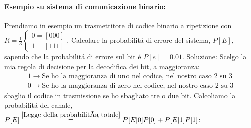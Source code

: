             \paragraph{Esempio su sistema di comunicazione binario:}
                Prendiamo in esempio un trasmettitore di codice binario a ripetizione con $R = \frac{1}{3}
                \begin{cases}
                    0 = [000]\nonumber \\
                    1 = [111]\nonumber    
                \end{cases}$. Calcolare la probabilitá di errore del sistema, $P[E]$, sapendo che la probabilitá di errore sul
                bit é $P[e] = 0.01$.
                Soluzione:
                Scelgo la mia regola di decisione per la decodifica dei bit, a maggioranza:
                \begin{gather}
                    1 \rightarrow \text{Se ho la maggioranza di uno nel codice, nel nostro caso 2 su 3} \nonumber \\
                    0 \rightarrow \text{Se ho la maggioranza di zero nel codice, nel nostro caso 2 su 3} \nonumber
                \end{gather}
                sbaglio il codice in trasmissione se ho sbagliato tre o due bit. Calcoliamo la probabilitá del canale,
                $P[E] \overset{\ref{Legge della probabilitá totale}}{=} P[E|0]P[0] + P[E|1]P[1]$:
